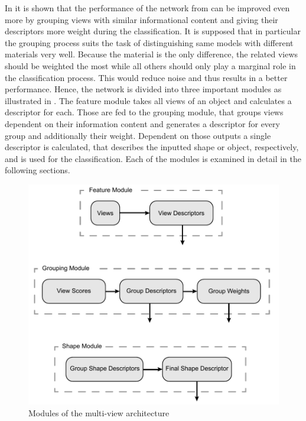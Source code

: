 In \cite{Feng2018} it is shown that the performance of the network from \cite{Su:2015:MCN:2919332.2919750} can be improved even more by grouping views with similar informational content and giving their descriptors more weight during the classification.
It is supposed that in particular the grouping process suits the task of distinguishing same models with different materials very well.
Because the material is the only difference, the related views should be weighted the most while all others should only play a marginal role in the classification process.
This would reduce noise and thus results in a better performance.
Hence, the network is divided into three important modules as illustrated in .
The feature module takes all views of an object and calculates a descriptor for each.
Those are fed to the grouping module, that groups views dependent on their information content and generates a descriptor for every group and additionally their weight.
Dependent on those outputs a single descriptor is calculated, that describes the inputted shape or object, respectively, and is used for the classification.
Each of the modules is examined in detail in the following sections.
\begin{figure}
	\centering
	\includegraphics[]{images/multi_view_architecture.pdf}
	\caption{Modules of the multi-view architecture}
	\label{fig:architecture-modules}
\end{figure}



